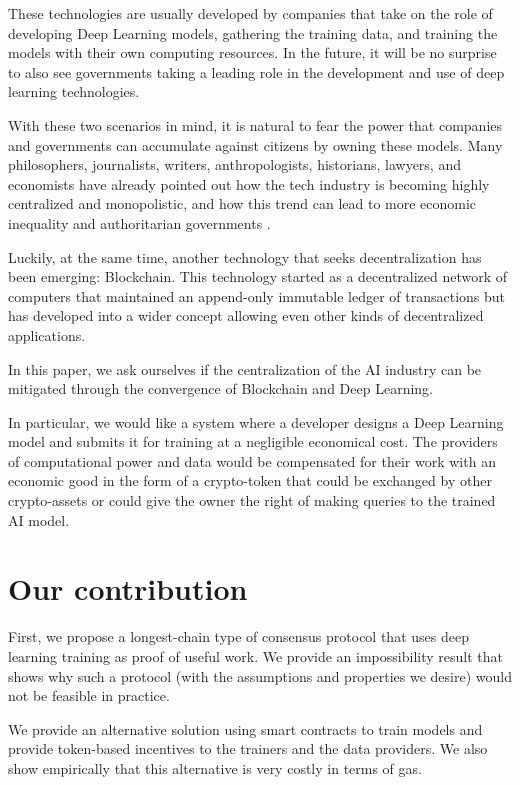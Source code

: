 \documentclass[conference]{IEEEtran}
\begin{document}
These technologies are usually developed by companies that take on the role of developing Deep Learning models, gathering the training data, and training the models with their own computing resources. In the future, it will be no surprise to also see governments taking a leading role in the development and use of deep learning technologies.

With these two scenarios in mind, it is natural to fear the power that companies and governments can accumulate against citizens by owning these models. Many philosophers, journalists, writers, anthropologists, historians, lawyers, and economists have already pointed out how the tech industry is becoming highly centralized and monopolistic, and how this trend can lead to more economic inequality and authoritarian governments \cite{b1} \cite{b2} \cite{b3} \cite{b4}.

Luckily, at the same time, another technology that seeks decentralization has been emerging: Blockchain. This technology started as a decentralized network of computers that maintained an append-only immutable ledger of transactions \cite{b6} but has developed into a wider concept allowing even other kinds of decentralized applications.

In this paper, we ask ourselves if the centralization of the AI industry can be mitigated through the convergence of Blockchain and Deep Learning.

In particular, we would like a system where a developer designs a Deep Learning model and submits it for training at a negligible economical cost. The providers of computational power and data would be compensated for their work with an economic good in the form of a crypto-token that could be exchanged by other crypto-assets or could give the owner the right of making queries to the trained AI model.

\section{Our contribution}
First, we propose a longest-chain type of consensus protocol that uses deep learning training as proof of useful work. We provide an impossibility result that shows why such a protocol (with the assumptions and properties we desire) would not be feasible in practice.

We provide an alternative solution using smart contracts to train models and provide token-based incentives to the trainers and the data providers. We also show empirically that this alternative is very costly in terms of gas.
\end{document}
